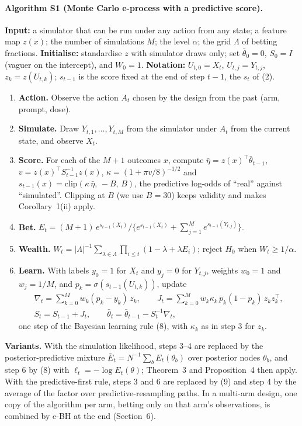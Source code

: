 \documentclass[11pt]{article}
\theoremstyle{remark}
\begin{document}
\paragraph{Algorithm S1 (Monte Carlo e-process with a predictive score).}
\textbf{Input:} a simulator that can be run under any action from any state; a
feature map $z(x)$; the number of simulations $M$; the level $\alpha$; the grid
$\Lambda$ of betting fractions. \textbf{Initialise:} standardise $z$ with
simulator draws only; set $\bar\theta_0 = 0$, $S_0 = I$ (vaguer on the intercept), and
$W_0 = 1$. \textbf{Notation:} $U_{t,0} = X_t$, $U_{t,j} = Y_{t,j}$,
$z_k = z(U_{t,k})$; $s_{t-1}$ is the score fixed at the end of step $t-1$, the
$s_t$ of (2).
\begin{enumerate}
  \item \textbf{Action.} Observe the action $A_t$ chosen by the design from the
        past (arm, prompt, dose).
  \item \textbf{Simulate.} Draw $Y_{t,1}, \ldots, Y_{t,M}$ from the simulator
        under $A_t$ from the current state, and observe $X_t$.
  \item \textbf{Score.} For each of the $M+1$ outcomes $x$, compute
        $\bar\eta = z(x)^\top \bar\theta_{t-1}$, $v = z(x)^\top S_{t-1}^{-1} z(x)$,
        $\kappa = (1 + \pi v/8)^{-1/2}$ and
        $s_{t-1}(x) = \mathrm{clip}(\kappa\,\bar\eta,\, -B,\, B)$, the predictive
        log-odds of ``real'' against ``simulated''. Clipping at $B$ (we use
        $B = 30$) keeps validity and makes Corollary~1(ii)
        apply.
  \item \textbf{Bet.}
        $E_t = (M+1)\, e^{s_{t-1}(X_t)}/\{e^{s_{t-1}(X_t)} + \sum_{j=1}^{M} e^{s_{t-1}(Y_{t,j})}\}$.
  \item \textbf{Wealth.} $W_t = |\Lambda|^{-1}\sum_{\lambda\in\Lambda}
        \prod_{i\le t}(1-\lambda+\lambda E_i)$; reject $H_0$ when
        $W_t \ge 1/\alpha$.
  \item \textbf{Learn.} With labels $y_0 = 1$ for $X_t$ and $y_j = 0$ for
        $Y_{t,j}$, weights $w_0 = 1$ and $w_j = 1/M$, and
        $p_k = \sigma(s_{t-1}(U_{t,k}))$, update
        \[
        \begin{gathered}
        \nabla_t = \sum_{k=0}^{M} w_k (p_k - y_k)\, z_k, \qquad
        J_t = \sum_{k=0}^{M} w_k \kappa_k\, p_k (1 - p_k)\, z_k z_k^\top, \\
        S_t = S_{t-1} + J_t, \qquad \bar\theta_t = \bar\theta_{t-1} - S_t^{-1} \nabla_t ,
        \end{gathered}
        \]
        one step of the Bayesian learning rule (8), with $\kappa_k$
        as in step 3 for $z_k$.
\end{enumerate}
\textbf{Variants.} With the simulation likelihood, steps 3--4 are replaced by
the posterior-predictive mixture $\bar E_t = N^{-1}\sum_b E_t(\theta_b)$ over
posterior nodes $\theta_b$, and step 6 by (8) with
$\ell_t = -\log E_t(\theta)$; Theorem~3 and
Proposition~4 then apply. With the predictive-first rule,
steps 3 and 6 are replaced by (9) and step 4 by the average of the
factor over predictive-resampling paths. In a multi-arm design, one copy of the
algorithm per arm, betting only on that arm's observations, is combined by e-BH
at the end (Section~6).
\end{document}
